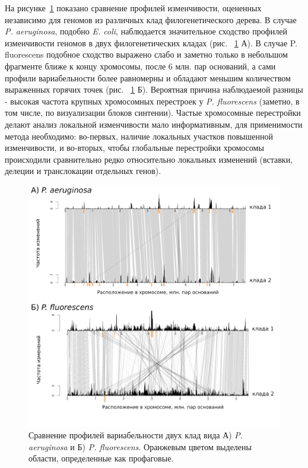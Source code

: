На рисунке~\ref{img:pseudo_complexity} показано сравнение профилей изменчивости, оцененных независимо для геномов из различных клад филогенетического дерева. В случае \textit{P. aeruginosa}, подобно \textit{E. coli}, наблюдается значительное сходство профилей изменчивости геномов в двух филогенетических кладах (рис. ~\ref{img:pseudo_complexity} А). В случае {P. fluorescens} подобное сходство выражено слабо и заметно только в небольшом фрагменте ближе к концу хромосомы, после 6 млн. пар оснований, а сами профили вариабельности более равномерны и обладают меньшим количеством выраженных горячих точек (рис. ~\ref{img:pseudo_complexity} Б). Вероятная причина наблюдаемой разницы - высокая частота крупных хромосомных перестроек у \textit{P. fluorescens} (заметно, в том числе, по визуализации блоков синтении). Частые хромосомные перестройки делают анализ локальной изменчивости мало информативным, для применимости метода необходимо: во-первых, наличие локальных участков повышенной изменчивости, и во-вторых, чтобы глобальные перестройки хромосомы происходили сравнительно редко относительно локальных изменений (вставки, делеции и транслокации отдельных генов).

\begin{figure}[!ht] 
  \center
    \includegraphics[width=\textwidth]{Dissertation/images/complexity/pseudo_complexity.png}
  \caption{Сравнение профилей вариабельности двух клад вида  А) \textit{P. aeruginosa} и Б) \textit{P. fluorescens}. Оранжевым цветом выделены области, определенные как профаговые.}
  \label{img:pseudo_complexity} 
\end{figure}

